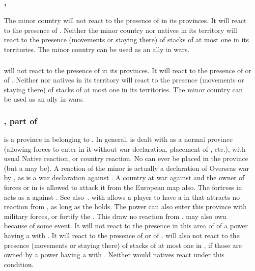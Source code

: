 \subsubsection{, }\label{chDiplo:Diplo-mysore}\label{chDiplo:Diplo-hyderabad}
\aparag The minor country will not react to the presence of \TP in its
provinces. It will react to the presence of \COL.
\aparag Neither the minor country nor natives in its territory will
react to the presence (movements or staying there) of stacks of at most
one \ARMY\faceplus in its territories.
\aparag The minor country can be used as an ally in wars.

\subsubsection{}\label{chDiplo:Diplo-iroquois}
\aparag {} will not react to the presence of \TP\facemoins
in its provinces. It will react to the presence of \COL or of
\TP\faceplus.
\aparag Neither  nor natives in its territory will react
to the presence (movements or staying there) of stacks of at most one
\ARMY\faceplus in its territories.
\aparag The minor country can be used as an ally in wars.
 

\subsubsection{, part of }\label{chDiplo:Diplo-ormus}
 is a \ROTW province in  belonging to
.
In general,  is dealt with as a normal \ROTW province
(allowing forces to enter in it without war declaration, placement of \TP, etc.),
with usual Native reaction, or country  reaction.
\bparag No \COL can ever be placed in the province (but a \TP may be).
\bparag A reaction of the minor 
is actually a declaration of Overseas war by ,
as is a war declaration against .
\bparag A country at war against  and the owner of  forces or \TP in
 is allowed to attack it from the European map also.
\bparag The fortress in  acts as a \Presidio against .
\bparag See also~.
\dipAT with  allows a player to have a \TP in
 that attracts no reaction from , as long as
the \dipAT holds.
\bparag The power can also enter this province with military forces, or
fortify the \TP. This draw no reaction from .
\aparag[Afghanistan.]  may also own
 because of some event. It will not react to
the presence in this area of \TP\facemoins of a power having a \dipAT
with . It will react to the presence of \COL or of
\TP\faceplus.
\bparag {} will also not react to the presence (movements or
staying there) of stacks of at most one \ARMY\faceplus in
, if those are owned by a power having a
\dipAT with .  Neither would natives react under this
condition.

